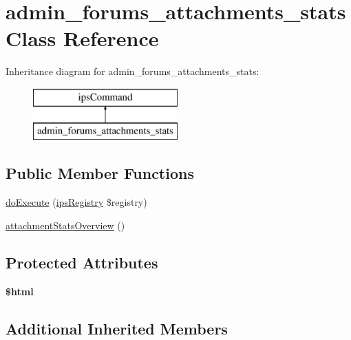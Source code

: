 \hypertarget{classadmin__forums__attachments__stats}{\section{admin\-\_\-forums\-\_\-attachments\-\_\-stats Class Reference}
\label{classadmin__forums__attachments__stats}
}
Inheritance diagram for admin\-\_\-forums\-\_\-attachments\-\_\-stats\-:\begin{figure}[H]
\begin{center}
\leavevmode
\includegraphics[height=2.000000cm]{classadmin__forums__attachments__stats}
\end{center}
\end{figure}
\subsection*{Public Member Functions}
\begin{DoxyCompactItemize}
\item 
\hyperlink{classadmin__forums__attachments__stats_afbc4e912a0604b94d47d66744c64d8ba}{do\-Execute} (\hyperlink{classips_registry}{ips\-Registry} \$registry)
\item 
\hyperlink{classadmin__forums__attachments__stats_a9386da5d68d215b6363eac6de0b3c816}{attachment\-Stats\-Overview} ()
\end{DoxyCompactItemize}
\subsection*{Protected Attributes}
\begin{DoxyCompactItemize}
\item 
\hypertarget{classadmin__forums__attachments__stats_a6f96e7fc92441776c9d1cd3386663b40}{{\bfseries \$html}}\label{classadmin__forums__attachments__stats_a6f96e7fc92441776c9d1cd3386663b40}

\end{DoxyCompactItemize}
\subsection*{Additional Inherited Members}


